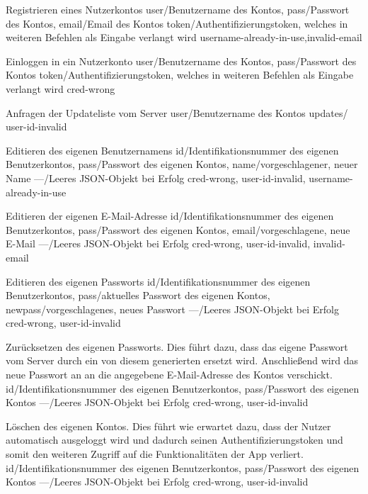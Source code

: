 \documentclass[parskip=full,11pt]{scrartcl}
\begin{document}
{Registrieren eines Nutzerkontos}
{user/Benutzername des Kontos,
pass/Passwort des Kontos,
email/Email des Kontos}
{token/Authentifizierungstoken{,} welches in weiteren Befehlen
als Eingabe verlangt wird}
{username-already-in-use,invalid-email}

{Einloggen in ein Nutzerkonto}
{user/Benutzername des Kontos,
pass/Passwort des Kontos}
{token/Authentifizierungstoken{,} welches in weiteren Befehlen
als Eingabe verlangt wird}
{cred-wrong}

{Anfragen der Updateliste vom Server}
{user/Benutzername des Kontos}
{updates/} %
{user-id-invalid}

{Editieren des eigenen Benutzernamens}
{id/Identifikationsnummer des eigenen Benutzerkontos,
pass/Passwort des eigenen Kontos,
name/vorgeschlagener{,} neuer Name}
{---/Leeres JSON-Objekt bei Erfolg}
{cred-wrong, user-id-invalid, username-already-in-use}

{Editieren der eigenen E-Mail-Adresse}
{id/Identifikationsnummer des eigenen Benutzerkontos,
pass/Passwort des eigenen Kontos,
email/vorgeschlagene{,} neue E-Mail}
{---/Leeres JSON-Objekt bei Erfolg}
{cred-wrong, user-id-invalid, invalid-email}\

{Editieren des eigenen Passworts}
{id/Identifikationsnummer des eigenen Benutzerkontos,
pass/aktuelles Passwort des eigenen Kontos,
newpass/vorgeschlagenes{,} neues Passwort}
{---/Leeres JSON-Objekt bei Erfolg}
{cred-wrong, user-id-invalid}

{Zurücksetzen des eigenen Passworts. Dies führt dazu, dass das eigene Passwort
vom Server durch ein von diesem generierten ersetzt wird. Anschließend wird das
neue Passwort an an die angegebene E-Mail-Adresse des Kontos verschickt.}
{id/Identifikationsnummer des eigenen Benutzerkontos,
pass/Passwort des eigenen Kontos}
{---/Leeres JSON-Objekt bei Erfolg}
{cred-wrong, user-id-invalid}

{Löschen des eigenen Kontos. Dies führt wie erwartet dazu{,}
dass der Nutzer automatisch ausgeloggt wird und dadurch seinen
Authentifizierungstoken und somit den weiteren Zugriff auf die Funktionalitäten
der App verliert.}
{id/Identifikationsnummer des eigenen Benutzerkontos,
pass/Passwort des eigenen Kontos}
{---/Leeres JSON-Objekt bei Erfolg}
{cred-wrong, user-id-invalid}
\end{document}
